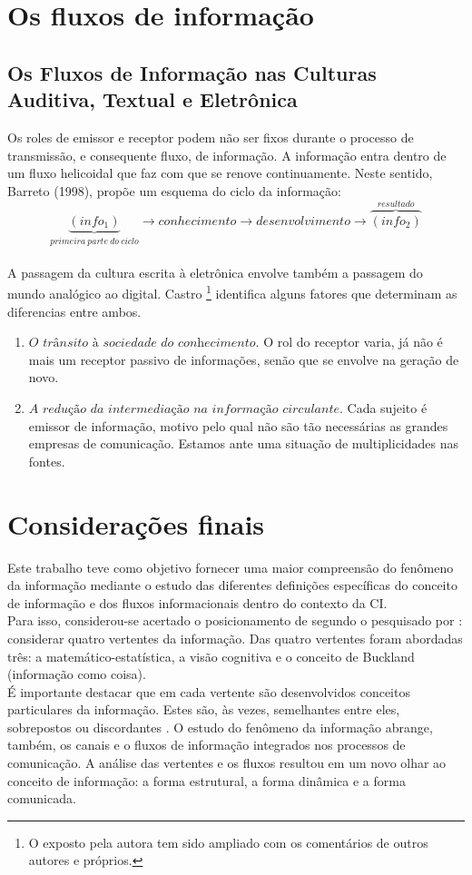 \documentclass[a4paper,11pt]{article}
\begin{document}
\section{Os fluxos de informação}

\subsection{Os Fluxos de Informação nas Culturas Auditiva, Textual e Eletrônica}
Os roles de emissor e receptor podem não ser fixos durante o processo de transmissão, e consequente fluxo, de informação. A informação entra dentro de um fluxo helicoidal que faz com que se renove continuamente. Neste sentido, Barreto (1998), propõe um esquema do ciclo da informação:
\begin{equation}
\underbrace{(info_{1})}_{primeira \ parte \ do \ ciclo} \rightarrow conhecimento \rightarrow desenvolvimento \rightarrow \overbrace{(info_{2})}^{resultado}
\label{eq:equ3}
\end{equation}
\\
A passagem da cultura escrita à eletrônica envolve também a passagem do mundo
analógico ao digital. Castro \footnote{O exposto pela autora tem sido ampliado com os comentários de outros autores e próprios.} identifica alguns fatores que determinam as diferencias
entre ambos.
\begin{enumerate}
\item $\textit{O trânsito à sociedade do conhecimento}$. O rol do receptor varia, já não é mais um
receptor passivo de informações, senão que se envolve na geração de novo.
\item $\textit{A redução da intermediação na informação circulante}$. Cada sujeito é emissor de
informação, motivo pelo qual não são tão necessárias as grandes empresas de
comunicação. Estamos ante uma situação de multiplicidades nas fontes.
\end{enumerate}
\section {Considerações finais}
Este trabalho teve como objetivo fornecer uma maior compreensão do fenômeno da
informação mediante o estudo das diferentes definições específicas do conceito de
informação e dos fluxos informacionais dentro do contexto da CI. \\
Para isso, considerou-se acertado o posicionamento de \cite{ara10} segundo o pesquisado por \cite{capu}:
considerar quatro vertentes da informação. Das quatro vertentes foram abordadas três: a
matemático-estatística, a visão cognitiva e o conceito de Buckland (informação como coisa). \\

É importante destacar que em cada vertente são desenvolvidos conceitos particulares da
informação. Estes são, às vezes, semelhantes entre eles, sobrepostos ou discordantes
. O estudo do fenômeno da informação abrange, também, os canais e o fluxos
de informação integrados nos processos de comunicação. A análise das vertentes e os fluxos
resultou em um novo olhar ao conceito de informação: a forma estrutural, a forma dinâmica
e a forma comunicada.

\cleardoublepage


\end{document}
